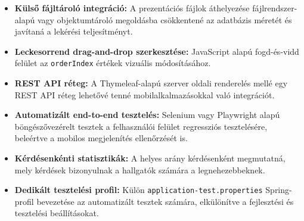 \begin{itemize}
    \item \textbf{Külső fájltároló integráció:} A prezentációs fájlok áthelyezése fájlrendszer-alapú vagy objektumtároló megoldásba csökkentené az adatbázis méretét és javítaná a lekérési teljesítményt.
    \item \textbf{Leckesorrend drag-and-drop szerkesztése:} JavaScript alapú fogd-és-vidd felület az \texttt{orderIndex} értékek vizuális módosításához.
    \item \textbf{REST API réteg:} A Thymeleaf-alapú szerver oldali renderelés mellé egy REST API réteg lehetővé tenné mobilalkalmazásokkal való integrációt.
    \item \textbf{Automatizált end-to-end tesztelés:} Selenium vagy Playwright alapú böngészővezérelt tesztek a felhasználói felület regressziós tesztelésére, beleértve a mobilos megjelenítés ellenőrzését is.
    \item \textbf{Kérdésenkénti statisztikák:} A helyes arány kérdésenként megmutatná, mely kérdések bizonyulnak a hallgatók számára a legnehezebbeknek.
    \item \textbf{Dedikált tesztelési profil:} Külön \texttt{application-test.properties} Spring-profil bevezetése az automatizált tesztek számára, elkülönítve a fejlesztési és tesztelési beállításokat.
\end{itemize}
